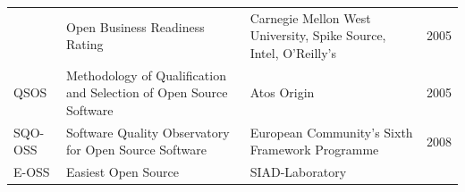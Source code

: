 \documentclass[12pt,magyar,a4paper,oneside]{scrreprt}
\begin{document}
\begin{longtable}[]{@{}llll@{}}
\begin{minipage}[t]{0.14\columnwidth}
\end{minipage} & \begin{minipage}[t]{0.49\columnwidth}\raggedright
Open Business Readiness Rating\strut
\end{minipage} & \begin{minipage}[t]{0.21\columnwidth}\raggedright
Carnegie Mellon West University, Spike Source, Intel, O'Reilly's\strut
\end{minipage} & \begin{minipage}[t]{0.04\columnwidth}\raggedright
2005\strut
\end{minipage}\tabularnewline
\begin{minipage}[t]{0.14\columnwidth}\raggedright
QSOS\strut
\end{minipage} & \begin{minipage}[t]{0.49\columnwidth}\raggedright
Methodology of Qualification and Selection of Open Source Software\strut
\end{minipage} & \begin{minipage}[t]{0.21\columnwidth}\raggedright
Atos Origin\strut
\end{minipage} & \begin{minipage}[t]{0.04\columnwidth}\raggedright
2005\strut
\end{minipage}\tabularnewline
\begin{minipage}[t]{0.14\columnwidth}\raggedright
SQO-OSS\strut
\end{minipage} & \begin{minipage}[t]{0.49\columnwidth}\raggedright
Software Quality Observatory for Open Source Software\strut
\end{minipage} & \begin{minipage}[t]{0.21\columnwidth}\raggedright
European Community's Sixth Framework Programme\strut
\end{minipage} & \begin{minipage}[t]{0.04\columnwidth}\raggedright
2008\strut
\end{minipage}\tabularnewline
\begin{minipage}[t]{0.14\columnwidth}\raggedright
E-OSS\strut
\end{minipage} & \begin{minipage}[t]{0.49\columnwidth}\raggedright
Easiest Open Source\strut
\end{minipage} & \begin{minipage}[t]{0.21\columnwidth}\raggedright
SIAD-Laboratory\strut
\end{minipage} & \begin{minipage}[t]{0.04\columnwidth}\raggedright

\end{minipage}
\end{longtable}
\end{document}
